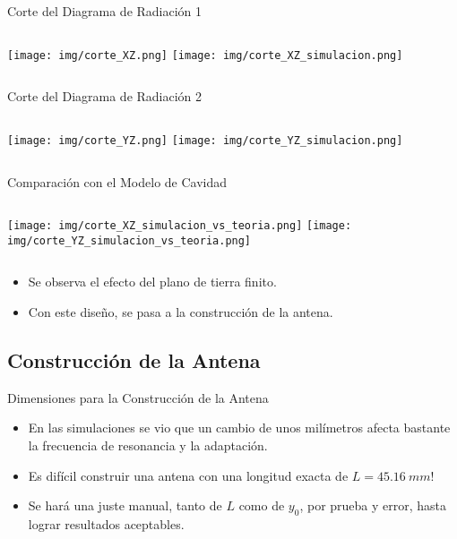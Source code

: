 \begin{frame}{Corte del Diagrama de Radiación 1}
\begin{columns}
        \texttt{[image: img/corte\_XZ.png]}
        \texttt{[image: img/corte\_XZ\_simulacion.png]}
\end{columns}
\end{frame}

\begin{frame}{Corte del Diagrama de Radiación 2}
\begin{columns}
        \texttt{[image: img/corte\_YZ.png]}
        \texttt{[image: img/corte\_YZ\_simulacion.png]}
\end{columns}
\end{frame}

\begin{frame}{Comparación con el Modelo de Cavidad}
\begin{columns}
        \texttt{[image: img/corte\_XZ\_simulacion\_vs\_teoria.png]}
        \texttt{[image: img/corte\_YZ\_simulacion\_vs\_teoria.png]}
\end{columns}
\begin{itemize}
    \item<2-> Se observa el efecto del plano de tierra finito.
    \item<3-> Con este diseño, se pasa a la construcción de la antena.
\end{itemize}
\end{frame}

\subsection{Construcción de la Antena}
\begin{frame}{Dimensiones para la Construcción de la Antena}
    \begin{itemize}
        \item<1-> En las simulaciones se vio que un cambio de unos milímetros afecta bastante la frecuencia de resonancia y la adaptación.
        \item<2-> Es difícil construir una antena con una longitud exacta de $L=45.16 \ mm$!
        \item<3-> Se hará una juste manual, tanto de $L$ como de $y_0$, por prueba y error, hasta lograr resultados aceptables.
    \end{itemize}
\end{frame}

